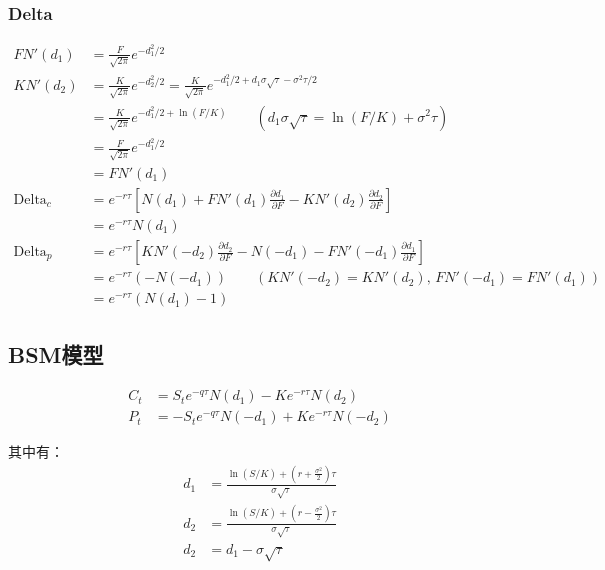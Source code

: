 \documentclass[11pt]{article}
\begin{document}
\subsubsection{Delta}

\begin{align*}
    FN'(d_1) &= \frac{F}{\sqrt{2\pi}}e^{-d_1^2/2} \\
    KN'(d_2) &= \frac{K}{\sqrt{2\pi}}e^{-d_2^2/2} = \frac{K}{\sqrt{2\pi}}e^{-d_1^2/2+d_1\sigma\sqrt{\tau}-\sigma^2\tau/2} \\
    &= \frac{K}{\sqrt{2\pi}}e^{-d_1^2/2+\ln(F/K)} 
    \qquad \left(d_1\sigma\sqrt{\tau} = \ln(F/K)+\sigma^2\tau\right) \\
    &= \frac{F}{\sqrt{2\pi}}e^{-d_1^2/2} \\
    &= FN'(d_1) \\
    \text{Delta}_c &= e^{-r\tau}[N(d_1) + FN'(d_1)\frac{\partial d_1}{\partial F} - KN'(d_2)\frac{\partial d_2}{\partial F}] \\
    &= e^{-r\tau}N(d_1) \\
    \text{Delta}_p &= e^{-r\tau}[KN'(-d_2)\frac{\partial d_2}{\partial F} - N(-d_1) - FN'(-d_1)\frac{\partial d_1}{\partial F}] \\
    &= e^{-r\tau}(-N(-d_1)) \qquad \left(KN'(-d_2) = KN'(d_2),\, FN'(-d_1)= FN'(d_1)\right) \\
    &= e^{-r\tau}(N(d_1)-1)
\end{align*}

\subsection{BSM模型}

\begin{align*}
    C_t &= S_te^{-q\tau}N(d_1) - Ke^{-r\tau}N(d_2) \\
    P_t &= -S_te^{-q\tau}N(-d_1) + Ke^{-r\tau}N(-d_2)
\end{align*}

其中有：
\begin{align*}
    d_1 &= \frac{\ln(S/K) + (r+\frac{\sigma^2}{2})\tau}{\sigma \sqrt{\tau}} \\
    d_2 &= \frac{\ln(S/K) + (r-\frac{\sigma^2}{2})\tau}{\sigma \sqrt{\tau}} \\
    d_2 &= d_1 - \sigma \sqrt{\tau}
\end{align*}
\end{document}
